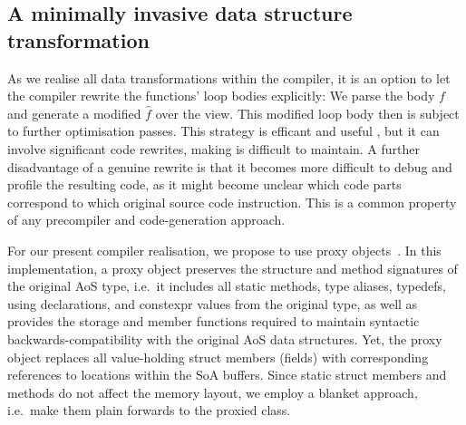 





\subsection{A minimally invasive data structure transformation}

As we realise all data transformations within the compiler, it is an option to let the compiler rewrite the functions' loop bodies explicitly:
We parse the body $f$ and generate a modified $\hat f$ over the view.
This modified loop body then is subject to further optimisation passes.
This strategy is efficant and useful \cite{Radtke:2024:AoS2SoA}, but it can involve significant code rewrites, making is difficult to maintain.
A further disadvantage of a genuine rewrite is that it becomes more difficult to debug and profile the resulting code, as it might become unclear which code parts correspond to which original source code instruction. 
This is a common property of any precompiler and code-generation approach. 


For our present compiler realisation, we propose to use proxy objects~\cite{Gamma:1994:DesignPatterns}.
In this implementation, a proxy object preserves the structure and method signatures of the original AoS type, i.e.~it includes all static methods, type aliases, typedefs, using declarations, and constexpr values from the original type, as well as provides the storage and member functions required to maintain syntactic backwards-compatibility with the original AoS data structures. Yet, the proxy object replaces all value-holding struct members (fields) with corresponding references to locations within the SoA buffers.
Since static struct members and methods do not affect the memory layout, we employ a blanket approach, i.e.~make them plain forwards to the proxied class.

